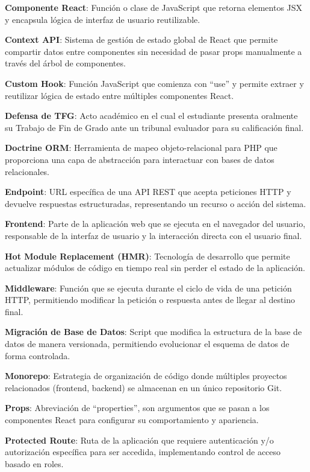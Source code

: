 \documentclass[12pt,a4paper,oneside]{report}
\begin{document}
\textbf{Componente React}: Función o clase de JavaScript que retorna
elementos JSX y encapsula lógica de interfaz de usuario reutilizable.

\textbf{Context API}: Sistema de gestión de estado global de React que
permite compartir datos entre componentes sin necesidad de pasar props
manualmente a través del árbol de componentes.

\textbf{Custom Hook}: Función JavaScript que comienza con ``use'' y
permite extraer y reutilizar lógica de estado entre múltiples
componentes React.

\textbf{Defensa de TFG}: Acto académico en el cual el estudiante
presenta oralmente su Trabajo de Fin de Grado ante un tribunal evaluador
para su calificación final.

\textbf{Doctrine ORM}: Herramienta de mapeo objeto-relacional para PHP
que proporciona una capa de abstracción para interactuar con bases de
datos relacionales.

\textbf{Endpoint}: URL específica de una API REST que acepta peticiones
HTTP y devuelve respuestas estructuradas, representando un recurso o
acción del sistema.

\textbf{Frontend}: Parte de la aplicación web que se ejecuta en el
navegador del usuario, responsable de la interfaz de usuario y la
interacción directa con el usuario final.

\textbf{Hot Module Replacement (HMR)}: Tecnología de desarrollo que
permite actualizar módulos de código en tiempo real sin perder el estado
de la aplicación.

\textbf{Middleware}: Función que se ejecuta durante el ciclo de vida de
una petición HTTP, permitiendo modificar la petición o respuesta antes
de llegar al destino final.

\textbf{Migración de Base de Datos}: Script que modifica la estructura
de la base de datos de manera versionada, permitiendo evolucionar el
esquema de datos de forma controlada.

\textbf{Monorepo}: Estrategia de organización de código donde múltiples
proyectos relacionados (frontend, backend) se almacenan en un único
repositorio Git.

\textbf{Props}: Abreviación de ``properties'', son argumentos que se
pasan a los componentes React para configurar su comportamiento y
apariencia.

\textbf{Protected Route}: Ruta de la aplicación que requiere
autenticación y/o autorización específica para ser accedida,
implementando control de acceso basado en roles.
\end{document}
